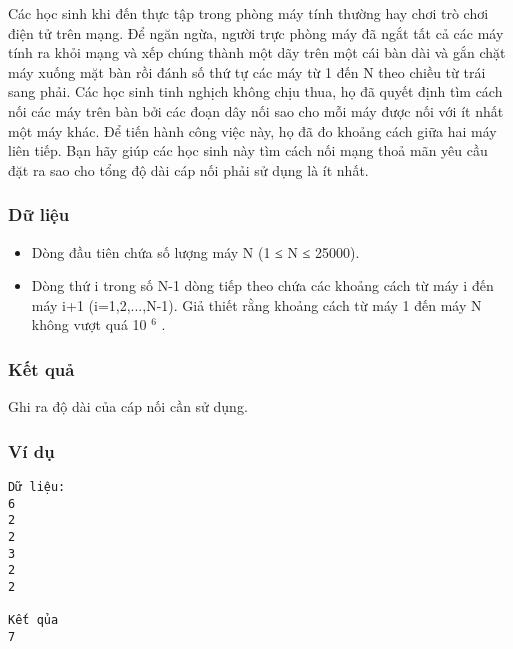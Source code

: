 



   Các học sinh khi đến thực tập trong phòng máy tính thường hay chơi trò chơi điện tử trên mạng. Để ngăn ngừa, người trực phòng máy đã ngắt tất cả các máy tính ra khỏi mạng và xếp chúng thành một dãy trên một cái bàn dài và gắn chặt máy xuống mặt bàn rồi đánh số thứ tự các máy từ 1 đến N theo chiều từ trái sang phải. Các học sinh tinh nghịch không chịu thua, họ đã quyết định tìm cách nối các máy trên bàn bởi các đoạn dây nối sao cho mỗi máy được nối với ít nhất một máy khác. Để tiến hành công việc này, họ đã đo khoảng cách giữa hai máy liên tiếp. Bạn hãy giúp các học sinh này tìm cách nối mạng thoả mãn yêu cầu đặt ra sao cho tổng độ dài cáp nối phải sử dụng là ít nhất.  

\subsubsection{   Dữ liệu  }
\begin{itemize}
	\item     Dòng đầu tiên chứa số lượng máy N (1 ≤ N ≤ 25000).   
	\item     Dòng thứ i trong số N-1 dòng tiếp theo chứa các khoảng cách từ máy i đến máy i+1 (i=1,2,...,N-1). Giả thiết rằng khoảng cách từ máy 1 đến máy N không vượt quá 10    $^     6    $    .   
\end{itemize}

\subsubsection{   Kết quả  }

   Ghi ra độ dài của cáp nối cần sử dụng.  

\subsubsection{   Ví dụ  }
\begin{verbatim}
Dữ liệu:
6
2
2
3
2
2

Kết qủa
7
\end{verbatim}